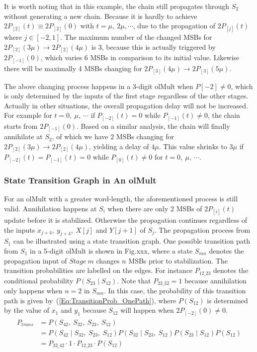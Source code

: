 \documentclass[a4paper, 11pt]{article}
\begin{document}
It is worth noting that in this example, the chain still propagates through $S_2$ without generating a new chain. Because it is hardly to achieve $2P_{[2]}(t)\equiv2P_{[2]}(0)$ with $t=\mu,~2\mu,\cdots$, due to the propagation of $2P_{[j]}(t)$ where $j\in[-2,1]$. The maximum number of the changed MSBs for $2P_{[2]}(3\mu)\rightarrow2P_{[2]}(4\mu)$ is 3, because this is actually triggered by $2P_{[-1]}(0)$, which varies 6 MSBs in comparison to its initial value. Likewise there will be maximally 4 MSBs changing for $2P_{[3]}(4\mu)\rightarrow2P_{[3]}(5\mu)$.

The above changing process happens in a 3-digit olMult when $P[-2]\neq0$, which is only determined by the inputs of the first stage regardless of the other stages. Actually in other situations, the overall propagation delay will not be increased. For example for $t=0,~\mu,~\cdots$ if $P_{[-2]}(t)=0$ while $P_{[-1]}(t)\neq0$, the chain starts from $2P_{[-1]}(0)$. Based on a similar analysis, the chain will finally annihilate at $S_2$, of which we have 2 MSBs changing for $2P_{[2]}(3\mu)\rightarrow2P_{[2]}(4\mu)$, yielding a delay of $4\mu$. This value shrinks to $3\mu$ if $P_{[-2]}(t)=P_{[-1]}(t)=0$ while $P_{[0]}(t)\neq0$ for $t=0,~\mu,~\cdots$.

\subsubsection{State Transition Graph in An olMult}
For an olMult with a greater word-length, the aforementioned process is still valid. Annihilation happens at $S_i$ when there are only 2 MSBs of $2P_{[i]}(t)$ update before it is stabilized. Otherwise the propagation continues regardless of the inputs $x_{j+4},~y_{j+4},~X[j]$ and $Y[j+1]$ of $S_j$. The propagation process from $S_1$ can be illustrated using a state transition graph. One possible transition path from $S_1$ in a 5-digit olMult is shown in Fig.xxx, where a state $S_{mn}$ denotes the propagation input of $Stage~m$ changes $n$ MSBs prior to stabilization. The transition probabilities are labelled on the edges. For instance $P_{12\_23}$ denotes the conditional probability $P(S_{23}\mid S_{12})$. Note that $P_{23\_32}=1$ because annihilation only happens when $n=2$ in $S_{mn}$. In this case, the probability of this transition path is given by~(\ref{Eq:TransitionProb_OnePath}), where $P(S_{12})$ is determined by the value of $x_1$ and $y_1$ because $S_{12}$ will happen when $2P_{[-2]}(0)\neq0$.
\begin{eqnarray}\label{Eq:TransitionProb_OnePath}
\begin{split}
  P_{trans} &= P(S_{42},~S_{32},~S_{23},~S_{12})\\
            &= P(S_{42}\mid S_{32},~S_{23},~S_{12})P(S_{32}\mid S_{23},~S_{12})P(S_{23}\mid S_{12})P(S_{12})\\
            &= P_{32\_42}\cdot1\cdot P_{12\_23}\cdot P(S_{12}) 
\end{split}
\end{eqnarray}
\end{document}
